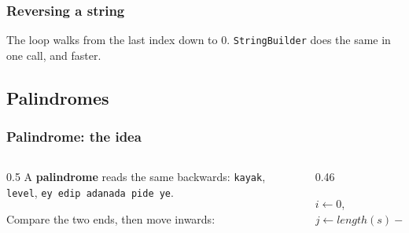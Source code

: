 \documentclass[aspectratio=169,10pt,compress]{beamer}
\begin{document}
\begin{frame}[t,fragile] \frametitle{Reversing a string}

  \vspace{0.3em}
  \small The loop walks from the last index down to 0. \texttt{StringBuilder} does the same in one call, and faster.
\end{frame}

\subsection[Palindrome]{Palindromes}




\begin{frame}[t,fragile] \frametitle{Palindrome: the idea}
  \begin{columns}[T]
    \begin{column}{0.5\textwidth}
      \small A \textbf{palindrome} reads the same backwards: \texttt{kayak}, \texttt{level},
      \texttt{ey edip adanada pide ye}.

      \vspace{0.4em}
      Compare the two ends, then move inwards:
      \begin{center}
      \end{center}
    \end{column}
    \begin{column}{0.46\textwidth}
      \SetAlFnt{\small}


\begin{algorithm}[H]
  \caption{IsPalindrome($s$)}
  $i \leftarrow 0$, \quad $j \leftarrow \mathit{length}(s) - 1$\;
  \;
\end{algorithm}


    \end{column}
  \end{columns}
\end{frame}
\end{document}
